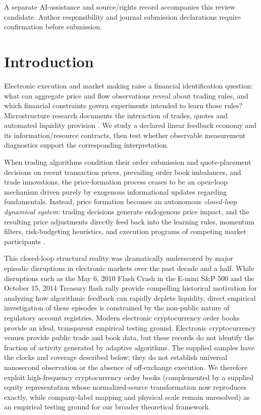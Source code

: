 \documentclass[12pt]{article}
\theoremstyle{definition}
\theoremstyle{remark}
\begin{document}
\noindent A separate AI-assistance and source/rights record accompanies this review candidate. Author responsibility and journal submission declarations require confirmation before submission.

\clearpage
\setcounter{page}{1}

\section{Introduction}
\label{sec:intro}

Electronic execution and market making raise a financial identification question: what can aggregate price and flow observations reveal about trading rules, and which financial constraints govern experiments intended to learn those rules? Microstructure research documents the interaction of trades, quotes and automated liquidity provision \citep{hasbrouck1991,menkveld2013,budish2015}. We study a declared linear feedback economy and its information/resource contracts, then test whether observable measurement diagnostics support the corresponding interpretation.

When trading algorithms condition their order submission and quote-placement decisions on recent transaction prices, prevailing order book imbalances, and trade innovations, the price-formation process ceases to be an open-loop mechanism driven purely by exogenous informational updates regarding fundamentals. Instead, price formation becomes an autonomous \emph{closed-loop dynamical system}: trading decisions generate endogenous price impact, and the resulting price adjustments directly feed back into the learning rules, momentum filters, risk-budgeting heuristics, and execution programs of competing market participants \citep{bouchaud2004fluctuations,cont2010stochastic,cont2014}. 

This closed-loop structural reality was dramatically underscored by major episodic disruptions in electronic markets over the past decade and a half. While disruptions such as the May 6, 2010 Flash Crash in the E-mini S\&P 500 and the October 15, 2014 Treasury flash rally provide compelling historical motivation for analyzing how algorithmic feedback can rapidly deplete liquidity, direct empirical investigation of these episodes is constrained by the non-public nature of regulatory account registries. Modern electronic cryptocurrency order books provide an ideal, transparent empirical testing ground. Electronic cryptocurrency venues provide public trade and book data, but these records do not identify the fraction of activity generated by adaptive algorithms. The supplied samples have the clocks and coverage described below; they do not establish universal nanosecond observation or the absence of off-exchange execution. We therefore exploit high-frequency cryptocurrency order books (complemented by a supplied equity representation whose normalized-source transformation now reproduces exactly, while company-label mapping and physical scale remain unresolved) as an empirical testing ground for our broader theoretical framework.
\end{document}
